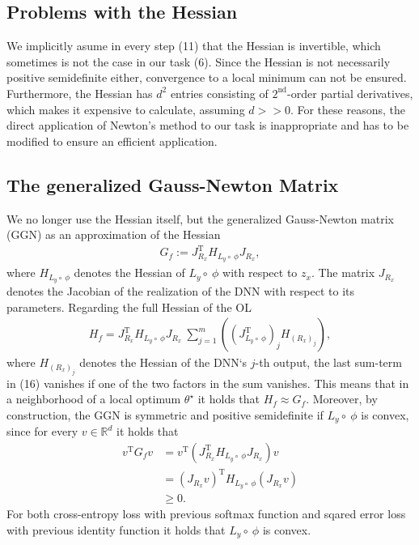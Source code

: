 \documentclass[conference]{IEEEtran}
\begin{document}
	\subsection{Problems with the Hessian}
	\noindent
	We implicitly asume in every step (11) that the Hessian is invertible, which sometimes is not the case in our task (6). Since the Hessian is not necessarily positive semidefinite either, convergence to a local minimum can not be ensured. Furthermore, the Hessian has $d^{2}$ entries consisting of $2^{\text{nd}}$-order partial derivatives, which makes it expensive to calculate, assuming $d>>0$. For these reasons, the direct application of Newton's method to our task is inappropriate and has to be modified to ensure an efficient application.


\subsection{The generalized Gauss-Newton Matrix}
\noindent
We no longer use the Hessian itself, but the generalized Gauss-Newton matrix (GGN) as an approximation of the Hessian
\begin{align}
	G_{f} := J_{R_{x}}^{\mathrm{T}}H_{L_{y}\circ\:\phi}J_{R_{x}},
\end{align}
where $H_{L_{y}\circ\:\phi}$ denotes the Hessian of $L_{y}\circ\:\phi$ with respect to $z_{x}$. The matrix $J_{R_{x}}$ denotes the Jacobian of the realization of the DNN with respect to its parameters.
Regarding the full Hessian of the OL
\begin{align}
	H_{f} = J_{R_{x}}^{\mathrm{T}}H_{L_{y}\circ\:\phi}J_{R_{x}}\:\sum_{j = 1}^{m}\left(\left(J_{L_{y}\circ \:\phi}^{\mathrm{T}}\right)_{j} H_{(R_{x})_{j}}\right),
\end{align}
where $H_{(R_{x})_{j}}$ denotes the Hessian of the DNN`s  $j$-th output, the last sum-term in (16) vanishes if one of the two factors in the sum vanishes.
This means that in a neighborhood of a local optimum $\theta^{\star}$ it holds that $H_{f} \approx G_{f}$.   Moreover, by construction, the GGN is symmetric and positive semidefinite if $L_{y}\circ\:\phi$ is convex, since for every $v\in\mathbb{R}^{d}$ it holds that
\begin{align}
	v^{\mathrm{T}}G_{f}v &= v^{\mathrm{T}}\left( J_{R_{x}}^{\mathrm{T}}H_{L_{y}\circ\:\phi}J_{R_{x}}\right)v\\
	&= \left(J_{R_{x}}v\right)^{\mathrm{T}}H_{L_{y}\circ\:\phi}\left(J_{R_{x}}v\right) \\
	&\geq 0.
\end{align}
For both cross-entropy loss with previous softmax function and sqared error loss with previous identity function it holds that $L_{y}\circ\:\phi$ is convex.
\end{document}
